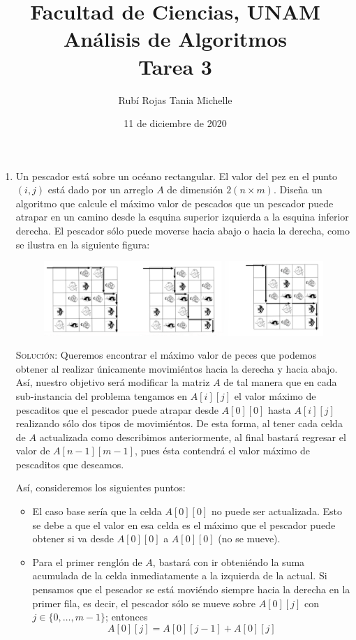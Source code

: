\documentclass[letterpaper,11pt]{article}
\title{Facultad de Ciencias, UNAM \\ 
       Análisis de Algoritmos \\ 
       Tarea 3}
\author{Rubí Rojas Tania Michelle}
\date{11 de diciembre de 2020}
\begin{document}
\maketitle

\begin{enumerate}
    \item Un pescador está sobre un océano rectangular. El valor del pez en el 
    punto $(i, j)$ está dado por un arreglo $A$ de dimensión $2 (n \times m)$.
    Diseña un algoritmo que calcule el máximo valor de pescados que un pescador
    puede atrapar en un camino desde la esquina superior izquierda a la esquina 
    inferior derecha. El pescador sólo puede moverse hacia abajo o hacia la 
    derecha, como se ilustra en la siguiente figura: 
    \begin{figure}[h]
        \centering
        \includegraphics[width=0.5\linewidth]{imagenes/ejercicio1.png}
    \end{figure}

    \textsc{Solución:} Queremos encontrar el máximo valor de peces que podemos 
    obtener al realizar únicamente movimiéntos hacia la derecha y hacia abajo. 
    Así, nuestro objetivo será modificar la matriz $A$ de tal manera que en 
    cada sub-instancia del problema tengamos en $A[i][j]$ el valor máximo de 
    pescaditos que el pescador puede atrapar desde $A[0][0]$ hasta $A[i][j]$
    realizando sólo dos tipos de movimiéntos. De esta forma, al tener cada 
    celda de $A$ actualizada como describimos anteriormente, al final bastará 
    regresar el valor de $A[n-1][m-1]$, pues ésta contendrá el valor máximo 
    de pescaditos que deseamos. 

    Así, consideremos los siguientes puntos:
    \begin{itemize}
        \item El caso base sería que la celda $A[0][0]$ no puede ser 
        actualizada. Esto se debe a que el valor en esa celda es el máximo 
        que el pescador puede obtener si va desde $A[0][0]$ a $A[0][0]$ (no 
        se mueve).

        \item Para el primer renglón de $A$, bastará con ir obteniéndo la 
        suma acumulada de la celda inmediatamente a la izquierda de la 
        actual. Si pensamos que el pescador se está moviéndo siempre hacia 
        la derecha en la primer fila, es decir, el pescador sólo se mueve 
        sobre $A[0][j]$ con $j \in \{0, \ldots, m-1\}$; entonces 
        \begin{equation*}
            A[0][j] = A[0][j-1] + A[0][j]
        \end{equation*}


\end{itemize}
\end{enumerate}
\end{document}
